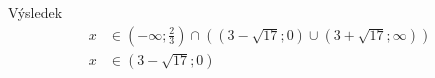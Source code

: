 Výsledek
\begin{equation*}
  \begin{aligned}
    x & \in \left(-\infty; \frac{2}{3} \right) \cap \left(\left(3 - \sqrt{17}; 0\right) \cup \left(3 + \sqrt{17}; \infty \right)\right) \\
    x & \in \left(3 - \sqrt{17}; 0\right)
  \end{aligned}
\end{equation*}


